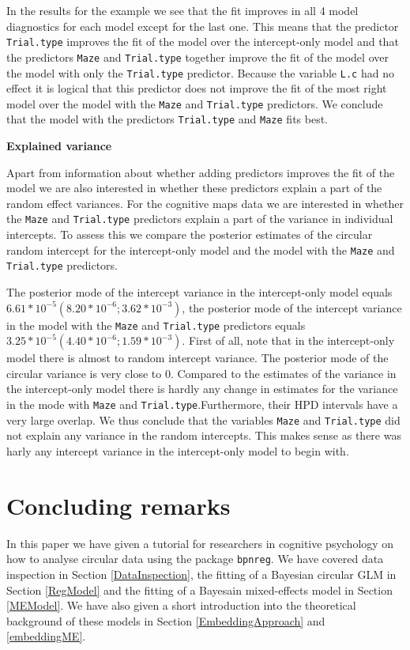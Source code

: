 \documentclass[11pt,]{article}
\begin{document}
In the results for the example we see that the fit improves in all 4
model diagnostics for each model except for the last one. This means
that the predictor \verb|Trial.type| improves the fit of the model over
the intercept-only model and that the predictors \verb|Maze| and
\verb|Trial.type| together improve the fit of the model over the model
with only the \verb|Trial.type| predictor. Because the variable
\verb|L.c| had no effect it is logical that this predictor does not
improve the fit of the most right model over the model with the
\verb|Maze| and \verb|Trial.type| predictors. We conclude that the model
with the predictors \verb|Trial.type| and \verb|Maze| fits best.

\textbf{Explained variance}

Apart from information about whether adding predictors improves the fit
of the model we are also interested in whether these predictors explain
a part of the random effect variances. For the cognitive maps data we
are interested in whether the \verb|Maze| and \verb|Trial.type|
predictors explain a part of the variance in individual intercepts. To
assess this we compare the posterior estimates of the circular random
intercept for the intercept-only model and the model with the
\verb|Maze| and \verb|Trial.type| predictors.

The posterior mode of the intercept variance in the intercept-only model
equals \(6.61*10^{-5} (8.20*10^{-6}; 3.62*10^{-3})\), the posterior mode
of the intercept variance in the model with the \verb|Maze| and
\verb|Trial.type| predictors equals
\(3.25*10^{-5} (4.40*10^{-6}; 1.59*10^{-3})\). First of all, note that
in the intercept-only model there is almost to random intercept
variance. The posterior mode of the circular variance is very close to
0. Compared to the estimates of the variance in the intercept-only model
there is hardly any change in estimates for the variance in the mode
with \verb|Maze| and \verb|Trial.type|.Furthermore, their HPD intervals
have a very large overlap. We thus conclude that the variables
\verb|Maze| and \verb|Trial.type| did not explain any variance in the
random intercepts. This makes sense as there was harly any intercept
variance in the intercept-only model to begin with.

\section{Concluding remarks}\label{conclusion}

In this paper we have given a tutorial for researchers in cognitive
psychology on how to analyse circular data using the package
\verb|bpnreg|. We have covered data inspection in Section
\ref{DataInspection}, the fitting of a Bayesian circular GLM in Section
\ref{RegModel} and the fitting of a Bayesain mixed-effects model in
Section \ref{MEModel}. We have also given a short introduction into the
theoretical background of these models in Section
\ref{EmbeddingApproach} and \ref{embeddingME}.
\end{document}
